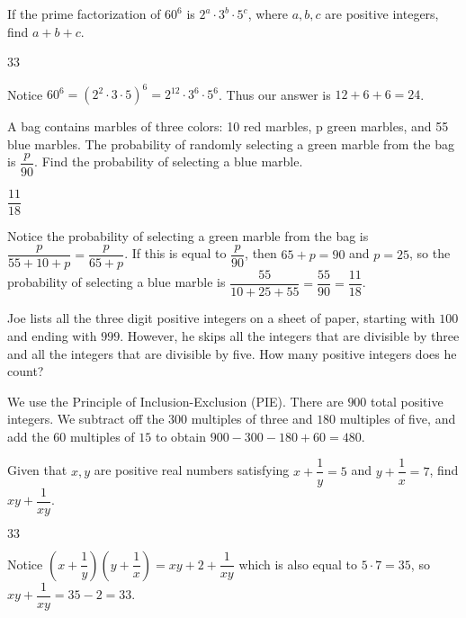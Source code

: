 \documentclass[11pt]{article}
\begin{document}
\begin{problem}
If the prime factorization of $60^6$ is  $2^a \cdot 3^b \cdot 5^c$, where $a,b,c$ are positive integers, find $a+b+c$.
\end{problem}
\begin{answer}
33
\end{answer}
\begin{solution}
Notice $60^6 = (2^2 \cdot 3 \cdot 5)^6 = 2^{12} \cdot 3^6 \cdot 5^6$. Thus our answer is $12 + 6 + 6 = 24$.
\end{solution}


\begin{problem}
A bag contains marbles of three colors: 10 red marbles, p green marbles, and 55 blue marbles. The probability of randomly selecting a green marble from the bag is $\dfrac{p}{90}$. Find the probability of selecting a blue marble.
\end{problem}
\begin{answer}
$\dfrac{11}{18}$
\end{answer}
\begin{solution}
 Notice the probability of selecting a green marble from the bag is $\dfrac{p}{55 + 10 + p} = \dfrac{p}{65 + p}$. If this is equal to $\dfrac{p}{90}$, then $65 + p = 90$ and $p = 25$, so the probability of selecting a blue marble is $\dfrac{55}{10 + 25 + 55} = \dfrac{55}{90} = \dfrac{11}{18}$.
\end{solution}


\begin{problem}
Joe lists all the three digit positive integers on a sheet of paper, starting with $100$ and ending with $999$. However, he skips all the integers that are divisible by three and all the integers that are divisible by five. How many positive integers does he count?
\end{problem}
\begin{answer}
\end{answer}
\begin{solution}
 We use the Principle of Inclusion-Exclusion (PIE). There are $900$ total positive integers. We subtract off the $300$ multiples of three and $180$ multiples of five, and add the $60$ multiples of $15$ to obtain $900 - 300 - 180 + 60 = \boxed{480}$.
\end{solution}


\begin{problem}
Given that $x,y$ are positive real numbers satisfying $x + \dfrac{1}{y} = 5$ and $y + \dfrac{1}{x} = 7$, find $xy + \dfrac{1}{xy}$.
\end{problem}
\begin{answer}
$33$
\end{answer}
\begin{solution}
 Notice $\left(x + \dfrac{1}{y}\right)\left(y + \dfrac{1}{x}\right) = xy + 2 + \dfrac{1}{xy}$ which is also equal to $5 \cdot 7 = 35$, so $xy + \dfrac{1}{xy} = 35-2 = \boxed{33}$.
\end{solution}
\end{document}
